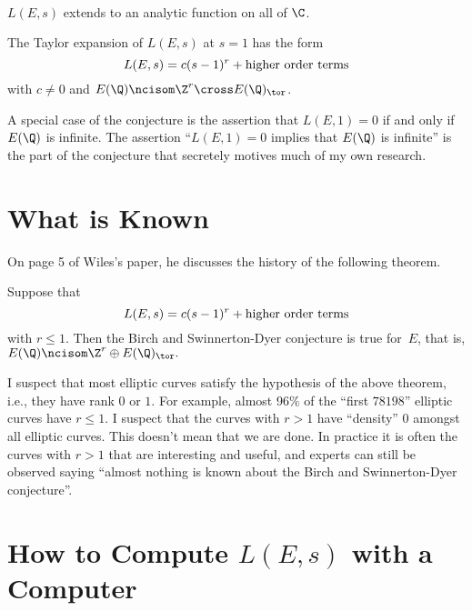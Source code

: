 \documentclass[11pt]{report}
\begin{document}
\begin{theorem}\mbox{}\\
  \mbox{}\hspace{5em}$L(E,s)$ extends to an analytic function on all of $\C$.
\end{theorem}

\begin{conjecture}
  The Taylor expansion of $L(E,s)$ at $s=1$ has the form
  $$
    L(E,s) = c(s-1)^r + \text{\rm  higher order terms}
  $$
  with $c\neq 0$ and $E(\Q)\ncisom \Z^r \cross E(\Q)_{\tor}$.
\end{conjecture}

A special case of the conjecture is the assertion that $L(E,1)=0$ if
and only if $E(\Q)$ is infinite.  The assertion ``$L(E,1)=0$ implies
that $E(\Q)$ is infinite'' is the part of the conjecture that secretely
motives much of my own research.

\section{What is Known}
On page 5 of Wiles's paper, he discusses the history
of the following theorem.
\begin{theorem}
  Suppose that
  $$
    L(E,s) = c(s-1)^r + \text{\rm  higher order terms}
  $$
  with $r\leq 1$.  Then the Birch and Swinnerton-Dyer conjecture
  is true for~$E$, that is,
  $E(\Q)\ncisom \Z^r\oplus E(\Q)_{\tor}.$
\end{theorem}

I suspect that most elliptic curves satisfy the hypothesis of the
above theorem, i.e., they have rank $0$ or $1$.  For example, almost
96\% of the ``first $78198$'' elliptic curves have $r\leq 1$.  I
suspect that the curves with $r>1$ have ``density'' $0$ amongst all
elliptic curves.  This doesn't mean that we are done.  In practice it
is often the curves with $r>1$ that are interesting and useful, and
experts can still be observed saying ``almost nothing is known about the
Birch and Swinnerton-Dyer conjecture''.


\section{How to Compute $L(E,s)$ with a Computer}
\end{document}
